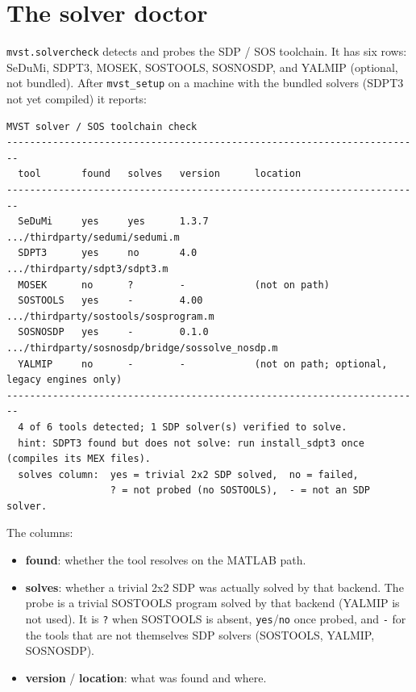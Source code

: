 \documentclass[11pt,oneside]{report}
\newcommand{\code}[1]{\texttt{#1}}
\providecommand{\tightlist}{\setlength{\itemsep}{0pt}\setlength{\parskip}{0pt}}
\begin{document}
\hypertarget{the-solver-doctor}{%
\section{The solver doctor}\label{the-solver-doctor}}

\code{mvst.solvercheck} detects and probes the SDP / SOS toolchain. It has six rows:
SeDuMi, SDPT3, MOSEK, SOSTOOLS, SOSNOSDP, and YALMIP (optional, not bundled). After \code{mvst\_setup} on a
machine with the bundled solvers (SDPT3 not yet compiled) it reports:

\begin{lstlisting}[style=outputstyle]
MVST solver / SOS toolchain check
------------------------------------------------------------------------
  tool       found   solves   version      location
------------------------------------------------------------------------
  SeDuMi     yes     yes      1.3.7        .../thirdparty/sedumi/sedumi.m
  SDPT3      yes     no       4.0          .../thirdparty/sdpt3/sdpt3.m
  MOSEK      no      ?        -            (not on path)
  SOSTOOLS   yes     -        4.00         .../thirdparty/sostools/sosprogram.m
  SOSNOSDP   yes     -        0.1.0        .../thirdparty/sosnosdp/bridge/sossolve_nosdp.m
  YALMIP     no      -        -            (not on path; optional, legacy engines only)
------------------------------------------------------------------------
  4 of 6 tools detected; 1 SDP solver(s) verified to solve.
  hint: SDPT3 found but does not solve: run install_sdpt3 once (compiles its MEX files).
  solves column:  yes = trivial 2x2 SDP solved,  no = failed,
                  ? = not probed (no SOSTOOLS),  - = not an SDP solver.
\end{lstlisting}

The columns:

\begin{itemize}
\tightlist
\item
  \textbf{found}: whether the tool resolves on the MATLAB path.
\item
  \textbf{solves}: whether a trivial 2x2 SDP was actually solved by that backend.
  The probe is a trivial SOSTOOLS program solved by that backend (YALMIP is not used). It is \code{?} when SOSTOOLS is absent, \code{yes}/\code{no} once probed,
  and \code{-} for the tools that are not themselves SDP solvers (SOSTOOLS, YALMIP,
  SOSNOSDP).
\item
  \textbf{version} / \textbf{location}: what was found and where.
\end{itemize}
\end{document}
